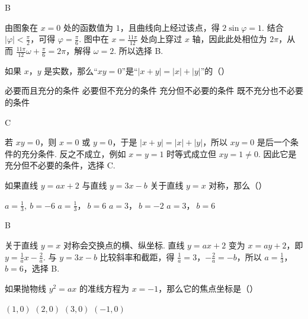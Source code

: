 \begin{answer}
B
\end{answer}

\begin{solution}
由图象在 \(x=0\) 处的函数值为 \(1\)，且曲线向上经过该点，得 \(2\sin\varphi=1\). 结合 \(\left|\varphi\right|<\frac{\pi}{2}\)，可得 \(\varphi=\frac{\pi}{6}\). 图中在 \(x=\frac{11\pi}{12}\) 处向上穿过 \(x\) 轴，因此此处相位为 \(2\pi\)，从而 \(\frac{11\pi}{12}\omega+\frac{\pi}{6}=2\pi\)，解得 \(\omega=2\). 所以选择 B.
\end{solution}

\begin{problem}
如果 \(x\)，\(y\) 是实数，那么“\(xy=0\)”是“\(\left|x+y\right|=\left|x\right|+\left|y\right|\)”的（\quad）

\choices
    {必要而且充分的条件}
    {必要但不充分的条件}
    {充分但不必要的条件}
    {既不充分也不必要的条件}
\end{problem}

\begin{answer}
C
\end{answer}

\begin{solution}
若 \(xy=0\)，则 \(x=0\) 或 \(y=0\)，于是 \(\left|x+y\right|=\left|x\right|+\left|y\right|\)，所以 \(xy=0\) 是后一个条件的充分条件. 反之不成立，例如 \(x=y=1\) 时等式成立但 \(xy=1\ne0\). 因此它是充分但不必要的条件，选择 C.
\end{solution}

\begin{problem}
如果直线 \(y=ax+2\) 与直线 \(y=3x-b\) 关于直线 \(y=x\) 对称，那么（\quad）

\choices
    {\(a=\frac{1}{3},\ b=-6\)}
    {\(a=\frac{1}{3}\)，\(\ b=6\)}
    {\(a=3\)，\(\ b=-2\)}
    {\(a=3\)，\(\ b=6\)}
\end{problem}

\begin{answer}
B
\end{answer}

\begin{solution}
关于直线 \(y=x\) 对称会交换点的横、纵坐标. 直线 \(y=ax+2\) 变为 \(x=ay+2\)，即 \(y=\frac{1}{a}x-\frac{2}{a}\). 与 \(y=3x-b\) 比较斜率和截距，得 \(\frac1a=3\)，\(-\frac2a=-b\)，所以 \(a=\frac13\)，\(b=6\)，选择 B.
\end{solution}

\begin{problem}
如果抛物线 \(y^2=ax\) 的准线方程为 \(x=-1\)，那么它的焦点坐标是（\quad）

\choices
    {\((1,0)\)}
    {\((2,0)\)}
    {\((3,0)\)}
    {\((-1,0)\)}
\end{problem}

